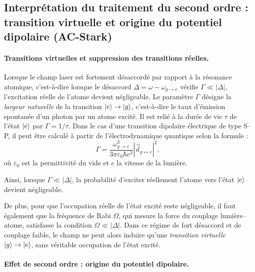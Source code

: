 \subsection{Interprétation du traitement du second ordre : transition virtuelle et origine du potentiel dipolaire (AC-Stark)}

\paragraph{Transitions virtuelles et suppression des transitions réelles.}
Lorsque le champ laser est fortement désaccordé par rapport à la résonance atomique, c’est-à-dire lorsque le désaccord 
\(\Delta = \omega - \omega_{\scriptscriptstyle g\rightarrow e}\) vérifie \( \Gamma \ll |\Delta|  \), 
l’excitation réelle de l’atome devient négligeable. 
Le paramètre \(\Gamma\) désigne la \emph{largeur naturelle} de la transition \(\ket{e} \rightarrow \ket{g}\), 
c’est-à-dire le taux d’émission spontanée d’un photon par un atome excité. 
Il est relié à la durée de vie \(\tau\) de l’état \(\ket{e}\) par \(\Gamma = 1/\tau\). 
Dans le cas d’une transition dipolaire électrique de type S–P, il peut être calculé à partir de l’électrodynamique quantique selon la formule :
\begin{equation}
	\Gamma = \frac{\omega_{\scriptscriptstyle g\rightarrow e}^3}{3 \pi \varepsilon_0 \hbar c^3} 
	| \vec{d}_{\scriptscriptstyle g \leftrightarrow e} |^2, \label{chap7:eq.Gamma.1}
\end{equation}
où \(\varepsilon_0\) est la permittivité du vide et \(c\) la vitesse de la lumière. 

\medskip

Ainsi, lorsque \(\Gamma \ll |\Delta| \), la probabilité d’exciter réellement l’atome vers l’état \(\ket{e}\) devient négligeable.

\medskip

De plus, pour que l’occupation réelle de l’état excité reste négligeable, 
il faut également que la fréquence de Rabi \(\Omega\), qui mesure la force du couplage lumière–atome, 
satisfasse la condition
\(
	\Omega \ll |\Delta|.
\)
Dans ce régime de fort désaccord et de couplage faible, 
le champ ne peut alors induire qu’une \emph{transition virtuelle} \(\ket{g} \to \ket{e}\), sans véritable occupation de l’état excité.


\medskip


\paragraph{Effet de second ordre : origine du potentiel dipolaire.}

